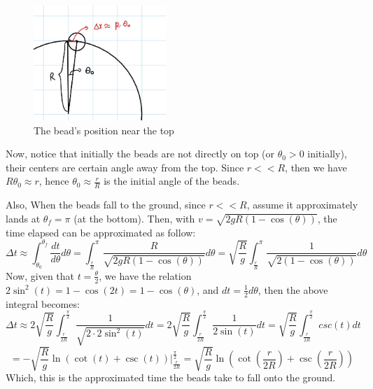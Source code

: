 \documentclass{article}
\begin{document}
\begin{figure}[h!]
    \begin{center}
        \includegraphics[width = 50mm]{q4 b.jpg}
        \caption{The bead's position near the top}
    \end{center}
\end{figure}

Now, notice that initially the beads are not directly on top (or $\theta_0>0$ initially), their centers are certain angle away from the top. Since $r<<R$, then we have $R\theta_0 \approx r$, hence $\theta_0 \approx \frac{r}{R}$ is the initial angle of the beads.

Also, When the beads fall to the ground, since $r<<R$, assume it approximately lands at $\theta_f=\pi$ (at the bottom). Then, with $v=\sqrt{2gR(1-\cos(\theta))}$, the time elapsed can be approximated as follow:
$$\Delta t \approx \int_{\theta_0}^{\theta_f}\frac{dt}{d\theta}d\theta = \int_{\frac{r}{R}}^{\pi}\frac{R}{\sqrt{2gR(1-\cos(\theta))}}d\theta = \sqrt{\frac{R}{g}}\int_{\frac{r}{R}}^{\pi}\frac{1}{\sqrt{2(1-\cos(\theta))}}d\theta$$
Now, given that $t=\frac{\theta}{2}$, we have the relation $2\sin^2(t) = 1-\cos(2t) = 1-\cos(\theta)$, and $dt = \frac{1}{2}d\theta$, then the above integral becomes:
$$\Delta t \approx 2\sqrt{\frac{R}{g}}\int_{\frac{r}{2R}}^{\frac{\pi}{2}}\frac{1}{\sqrt{2\cdot 2\sin^2(t)}}dt = 2\sqrt{\frac{R}{g}}\int_{\frac{r}{2R}}^{\frac{\pi}{2}}\frac{1}{2\sin(t)}dt = \sqrt{\frac{R}{g}}\int_{\frac{r}{2R}}^{\frac{\pi}{2}}csc(t)dt$$
$$ = -\sqrt{\frac{R}{g}}\ln(\cot(t)+\csc(t))\bigg|_{\frac{r}{2R}}^{\frac{\pi}{2}} = \sqrt{\frac{R}{g}}\ln\left(\cot\left(\frac{r}{2R}\right)+\csc\left(\frac{r}{2R}\right)\right)$$
Which, this is the approximated time the beads take to fall onto the ground.

\hfil

\hfil
\end{document}
